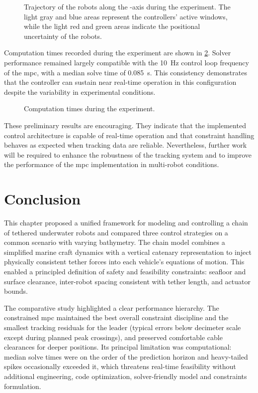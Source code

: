 \begin{figure}
	\centering
	\caption{
		Trajectory of the robots along the -axis during the experiment. The light gray and blue
		areas represent the controllers' active windows, while the light red and green areas indicate the
		positional uncertainty of the robots.
	}
	\label{rcc_sdoea_mpc_2_follower_pose_x}
\end{figure}

Computation times recorded during the experiment are shown in \cref{rcc_sdoea_mpc_2_compute_time}.
Solver performance remained largely compatible with the \qty{10}{\hertz} control loop frequency of
the \ac{mpc}, with a median solve time of \qty{0.085}{\s}. This consistency demonstrates that the
controller can sustain near real-time operation in this configuration despite the variability in
experimental conditions.

\begin{figure}
	\centering
	\caption{Computation times during the experiment.}
	\label{rcc_sdoea_mpc_2_compute_time}
\end{figure}

These preliminary results are encouraging. They indicate that the implemented control architecture
is capable of real-time operation and that constraint handling behaves as expected when tracking
data are reliable. Nevertheless, further work will be required to enhance the robustness of the
tracking system and to improve the performance of the \ac{mpc} implementation in multi-robot
conditions.

\section{Conclusion}

This chapter proposed a unified framework for modeling and controlling a chain of tethered
underwater robots and compared three control strategies on a common scenario with varying
bathymetry. The chain model combines a simplified marine craft dynamics with a vertical catenary
representation to inject physically consistent tether forces into each vehicle's equations of
motion. This enabled a principled definition of safety and feasibility constraints: seafloor and
surface clearance, inter-robot spacing consistent with tether length, and actuator bounds.

The comparative study highlighted a clear performance hierarchy. The constrained \ac{mpc}
maintained the best overall constraint discipline and the smallest tracking residuals for the
leader (typical errors below decimeter scale except during planned peak crossings), and preserved
comfortable cable clearances for deeper positions. Its principal limitation was computational:
median solve times were on the order of the prediction horizon and heavy-tailed spikes occasionally
exceeded it, which threatens real-time feasibility without additional engineering, code
optimization, solver-friendly model and constraints formulation.

